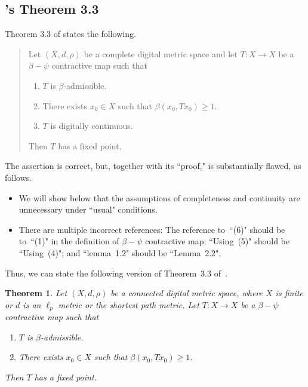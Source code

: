 \documentclass{article}
\newtheorem{thm}{Theorem}
\numberwithin{thm}{section}
\begin{document}
\subsection{\cite{JyotiRani17}'s Theorem 3.3}
Theorem 3.3 of \cite{JyotiRani17} states
the following.
\begin{quote}
    Let $(X,d,\rho)$ be
    a complete digital metric space and let
    $T: X \to X$ be a
    $\beta-\psi$ contractive map
    such that
    \begin{enumerate}
        \item $T$ is
        $\beta$-admissible.
        \item There exists
        $x_0 \in X$ such
        that $\beta(x_0,Tx_0) \ge 1$.
        \item $T$ is digitally continuous.
    \end{enumerate}
    Then $T$ has a fixed
    point.
\end{quote}

The assertion is correct,
but, together with its
``proof," is substantially flawed, as follows.
\begin{itemize}
    \item We will show
    below that the assumptions of 
    completeness and continuity are
    unnecessary under ``usual" conditions.
    \item There are multiple incorrect references: The reference to~``(6)"
    should be to~``(1)" in
    the definition of
    $\beta-\psi$ contractive map; ``Using~(5)" should be
    ``Using~(4)"; and
    ``lemma~1.2" should be
    ``Lemma~2.2".
\end{itemize}

Thus, we can state the
following version of
Theorem~3.3 of~\cite{JyotiRani17}.

\begin{thm}
    \label{betterJyotiRani3.3}
    Let $(X,d, \rho)$ be
    a connected digital metric space,
    where $X$ is finite or $d$ is an
    $\ell_p$ metric or the
    shortest path metric. 
    Let $T: X \to X$ be a
    $\beta-\psi$ contractive map
    such that
    \begin{enumerate}
        \item $T$ is
        $\beta$-admissible.
        \item There exists
        $x_0 \in X$ such
        that $\beta(x_0,Tx_0) \ge 1$.
    \end{enumerate}
    Then $T$ has a fixed
    point.
\end{thm}
\end{document}
